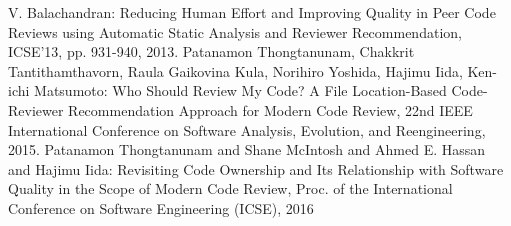 \documentclass{jsarticle}
\begin{document}
\begin{thebibliography}{10}
    V. Balachandran: Reducing Human Effort and Improving Quality in Peer Code Reviews using Automatic Static Analysis and Reviewer Recommendation, ICSE'13, pp. 931-940, 2013.
    Patanamon Thongtanunam, Chakkrit Tantithamthavorn, Raula Gaikovina Kula, Norihiro Yoshida, Hajimu Iida, Ken-ichi Matsumoto: Who Should Review My Code? A File Location-Based Code-Reviewer Recommendation Approach for Modern Code Review, 22nd IEEE International Conference on Software Analysis, Evolution, and Reengineering, 2015.
    Patanamon Thongtanunam and Shane McIntosh and Ahmed E. Hassan and Hajimu Iida: Revisiting Code Ownership and Its Relationship with Software Quality in the Scope of Modern Code Review, Proc. of the International Conference on Software Engineering (ICSE), 2016
 \end{thebibliography}
\end{document}
